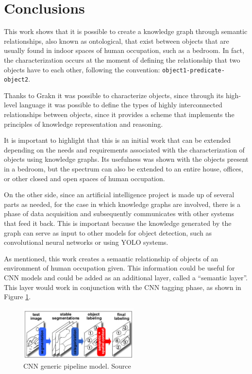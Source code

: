\section{Conclusions}
This work shows that it is possible to create a knowledge graph through semantic relationships, also known as ontological, that exist between objects that are usually found in indoor spaces of human occupation, such as a bedroom. In fact, the characterization occurs at the moment of defining the relationship that two objects have to each other, following the convention: \texttt{object1-predicate-object2}.

Thanks to Grakn it was possible to characterize objects, since through its high-level language it was possible to define the types of highly interconnected relationships between objects, since it provides a scheme that implements the principles of knowledge representation and reasoning.

It is important to highlight that this is an initial work that can be extended depending on the needs and requirements associated with the characterization of objects using knowledge graphs. Its usefulness was shown with the objects present in a bedroom, but the spectrum can also be extended to an entire house, offices, or other closed and open spaces of human occupation.

On the other side, since an artificial intelligence project is made up of several parts as needed, for the case in which knowledge graphs are involved, there is a phase of data acquisition and subsequently communicates with other systems that feed it back. This is important because the knowledge generated by the graph can serve as input to other models for object detection, such as convolutional neural networks or using YOLO systems.

As mentioned, this work creates a semantic relationship of objects of an environment of human occupation given. This information could be useful for CNN models and could be added as an additional layer, called a ``semantic layer''. This layer would work in conjunction with the CNN tagging phase, as shown in Figure \ref{fig:pipeline}.

\begin{figure}[H]
    \centering
    \includegraphics[width=6cm]{figures/pipeline.png}
    \caption{CNN generic pipeline model. Source \cite{Galleguillos2}}
    \label{fig:pipeline}
\end{figure}

